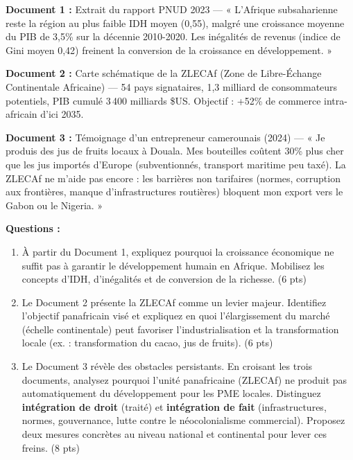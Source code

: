 \documentclass[11pt]{article}
\begin{document}
\begin{exercice}
\textbf{Document 1 :} Extrait du rapport PNUD 2023 — « L'Afrique subsaharienne reste la région au plus faible IDH moyen (0,55), malgré une croissance moyenne du PIB de 3,5\% sur la décennie 2010-2020. Les inégalités de revenus (indice de Gini moyen 0,42) freinent la conversion de la croissance en développement. »

\textbf{Document 2 :} Carte schématique de la ZLECAf (Zone de Libre-Échange Continentale Africaine) — 54 pays signataires, 1,3 milliard de consommateurs potentiels, PIB cumulé 3\,400 milliards \$US. Objectif : +52\% de commerce intra-africain d'ici 2035.

\textbf{Document 3 :} Témoignage d'un entrepreneur camerounais (2024) — « Je produis des jus de fruits locaux à Douala. Mes bouteilles coûtent 30\% plus cher que les jus importés d'Europe (subventionnés, transport maritime peu taxé). La ZLECAf ne m'aide pas encore : les barrières non tarifaires (normes, corruption aux frontières, manque d'infrastructures routières) bloquent mon export vers le Gabon ou le Nigeria. »

\textbf{Questions :}
\begin{enumerate}
\item À partir du Document 1, expliquez pourquoi la croissance économique ne suffit pas à garantir le développement humain en Afrique. Mobilisez les concepts d'IDH, d'inégalités et de conversion de la richesse. (6 pts)
\item Le Document 2 présente la ZLECAf comme un levier majeur. Identifiez l'objectif panafricain visé et expliquez en quoi l'élargissement du marché (échelle continentale) peut favoriser l'industrialisation et la transformation locale (ex. : transformation du cacao, jus de fruits). (6 pts)
\item Le Document 3 révèle des obstacles persistants. En croisant les trois documents, analysez pourquoi l'unité panafricaine (ZLECAf) ne produit pas automatiquement du développement pour les PME locales. Distinguez \textbf{intégration de droit} (traité) et \textbf{intégration de fait} (infrastructures, normes, gouvernance, lutte contre le néocolonialisme commercial). Proposez deux mesures concrètes au niveau national et continental pour lever ces freins. (8 pts)
\end{enumerate}
\end{exercice}

\newpage
\end{document}
